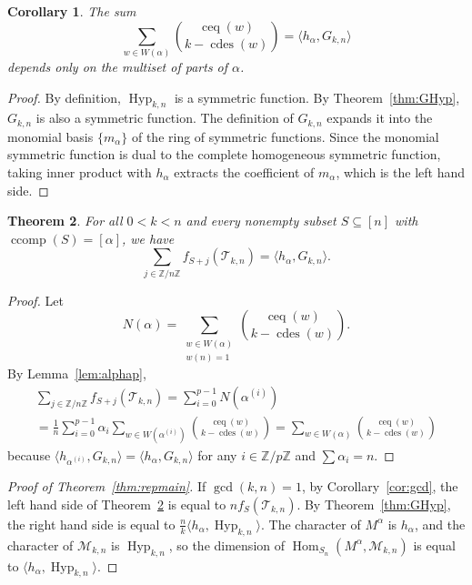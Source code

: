 \documentclass[12pt,reqno]{amsart}
\theoremstyle{plain}
\newtheorem{theorem}{Theorem}[section]
\newtheorem{corollary}[theorem]{Corollary}
\theoremstyle{definition}
\newcommand{\Z}{\mathbb{Z}}
\newcommand{\Tri}{\mathcal{T}_{k,n}}
\DeclareMathOperator{\ccomp}{ccomp}
\DeclareMathOperator{\Hyp}{Hyp}
\DeclareMathOperator{\Hom}{Hom}
\DeclareMathOperator{\cdes}{cdes}
\DeclareMathOperator{\ceq}{ceq}
\begin{document}
\begin{corollary}\label{cor:Gsym}
	The sum
	\[
		\sum_{w \in W(\alpha)} \binom{\ceq(w)}{k - \cdes(w)} = \langle h_\alpha, G_{k,n} \rangle
	\]
	depends only on the multiset of parts of $ \alpha $.
\end{corollary}
\begin{proof}
	By definition, $\Hyp_{k,n}$ is a symmetric function. By Theorem~\ref{thm:GHyp}, $G_{k,n}$ is also a symmetric function. The definition of $G_{k,n}$ expands it into the monomial basis $\{m_\alpha\}$ of the ring of symmetric functions. Since the monomial symmetric function is dual to the complete homogeneous symmetric function, taking inner product with $h_\alpha$ extracts the coefficient of $m_\alpha$, which is the left hand side.
\end{proof}

\begin{theorem}\label{thm:ftoG}
	For all $ 0 < k < n $
	and every nonempty subset $ S \subseteq [n] $ with $
		\ccomp(S) = [\alpha]$, we have
	\begin{equation}
		\sum_{j \in \Z/n\Z} f_{S+j}(\Tri) = \langle h_\alpha, G_{k,n} \rangle.
	\end{equation}
\end{theorem}
\begin{proof}
	Let
	\[
		N(\alpha) = \sum_{\substack{w \in W(\alpha) \\ w(n) = 1}} \binom{\ceq(w)}{k - \cdes(w)}.
	\]
	By Lemma~\ref{lem:alphap},
	\begin{multline}
		\sum_{j \in \Z/n\Z} f_{S+j}(\Tri)  = \sum_{i=0}^{p-1} N(\alpha^{(i)})
		\\= \frac{1}{n} \sum_{i=0}^{p-1} \alpha_i \sum_{w \in W(\alpha^{(i)})} \binom{\ceq(w)}{k - \cdes(w)} = \sum_{w \in W(\alpha)} \binom{\ceq(w)}{k - \cdes(w)}
	\end{multline}
	because $\langle h_{\alpha^{(i)}}, G_{k,n} \rangle = \langle h_\alpha, G_{k,n} \rangle$ for any $i \in \Z/p\Z$ and $\sum \alpha_i = n$.
\end{proof}

\begin{proof}[Proof of Theorem~\ref{thm:repmain}]
	If $\gcd(k,n) = 1$, by Corollary~\ref{cor:gcd}, the left hand side of Theorem~\ref{thm:ftoG} is equal to $n f_S(\Tri)$. By Theorem~\ref{thm:GHyp}, the right hand side is equal to $\frac{n}{k} \langle h_\alpha, \Hyp_{k,n} \rangle$.
	The character of $M^\alpha$ is $h_\alpha$, and the character of $\mathcal{M}_{k,n}$ is $\Hyp_{k,n}$, so the dimension of $\Hom_{S_n}(M^\alpha, \mathcal{M}_{k,n})$ is equal to $\langle h_\alpha, \Hyp_{k,n} \rangle$.
\end{proof}
\end{document}
